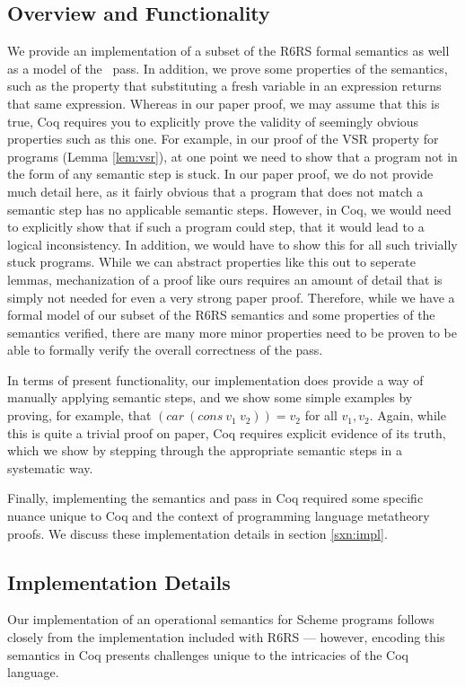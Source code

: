 \subsection{Overview and Functionality}
We provide an implementation of a subset of the R6RS formal semantics as well as a model of the \caname\ pass. In addition, we prove some properties of the semantics, such as the property that substituting a fresh variable in an expression returns that same expression. Whereas in our paper proof, we may assume that this is true, Coq requires you to explicitly prove the validity of seemingly obvious properties such as this one. For example, in our proof of the VSR property for programs (Lemma \ref{lem:vsr}), at one point we need to show that a program not in the form of any semantic step is stuck. In our paper proof, we do not provide much detail here, as it fairly obvious that a program that does not match a semantic step has no applicable semantic steps. However, in Coq, we would need to explicitly show that if such a program could step, that it would lead to a logical inconsistency. In addition, we would have to show this for all such trivially stuck programs. While we can abstract properties like this out to seperate lemmas, mechanization of a proof like ours requires an amount of detail that is simply not needed for even a very strong paper proof. Therefore, while we have a formal model of our subset of the R6RS semantics and some properties of the semantics verified, there are many more minor properties need to be proven to be able to formally verify the overall correctness of the pass.

In terms of present functionality, our implementation does provide a way of manually applying semantic steps, and we show some simple examples by proving, for example, that $(car\ (cons\ v_1\ v_2)) = v_2$ for all $v_1, v_2$. Again, while this is quite a trivial proof on paper, Coq requires explicit evidence of its truth, which we show by stepping through the appropriate semantic steps in a systematic way.

Finally, implementing the semantics and pass in Coq required some specific nuance unique to Coq and the context of programming language metatheory proofs. We discuss these implementation details in section \ref{sxn:impl}.
\subsection{Implementation Details\label{sxn:impl}}
Our implementation of an operational semantics for Scheme programs follows closely from the implementation included with R6RS --- however, encoding this semantics in Coq presents challenges unique to the intricacies of the Coq language.
